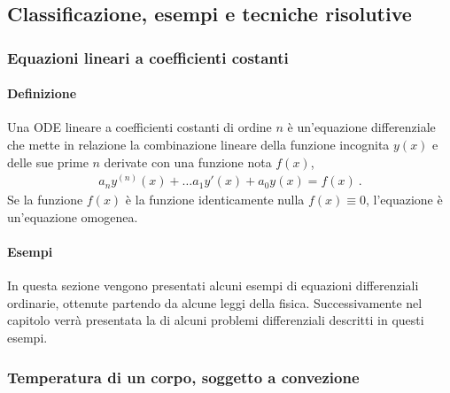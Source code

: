 \documentclass[letterpaper,10pt,italian]{jupyterBook}
\begin{document}
\subsection{Classificazione, esempi e tecniche risolutive}
\label{\detokenize{ch/ode:classificazione-esempi-e-tecniche-risolutive}}\label{\detokenize{ch/ode:ode-hs-types}}

\subsubsection{Equazioni lineari a coefficienti costanti}
\label{\detokenize{ch/ode:equazioni-lineari-a-coefficienti-costanti}}\label{\detokenize{ch/ode:ode-hs-types-linear-const}}

\paragraph{Definizione}
\label{\detokenize{ch/ode:definizione}}\label{\detokenize{ch/ode:ode-hs-types-linear-const-def}}
\sphinxAtStartPar
Una ODE lineare a coefficienti costanti di ordine \(n\) è un’equazione differenziale che mette in relazione la combinazione lineare della funzione incognita \(y(x)\) e delle sue prime \(n\) derivate con una funzione nota \(f(x)\),
\begin{equation*}
\begin{split}a_n y^{(n)}(x) + \dots a_1 y'(x) + a_0 y(x) = f(x) \ .\end{split}
\end{equation*}
\sphinxAtStartPar
Se la funzione \(f(x)\) è la funzione identicamente nulla \(f(x) \equiv 0\), l’equazione è un’equazione omogenea.


\paragraph{Esempi}
\label{\detokenize{ch/ode:esempi}}\label{\detokenize{ch/ode:ode-hs-types-linear-const-ex}}
\sphinxAtStartPar
In questa sezione vengono presentati alcuni esempi di equazioni differenziali ordinarie, ottenute partendo da alcune leggi della fisica. Successivamente nel capitolo verrà presentata la {\hyperref[\detokenize{ch/ode:ode-hs-types-linear-const-ex-sol}]{}} di alcuni problemi differenziali descritti in questi esempi.
\subsubsection*{Temperatura di un corpo, soggetto a convezione}
\end{document}
